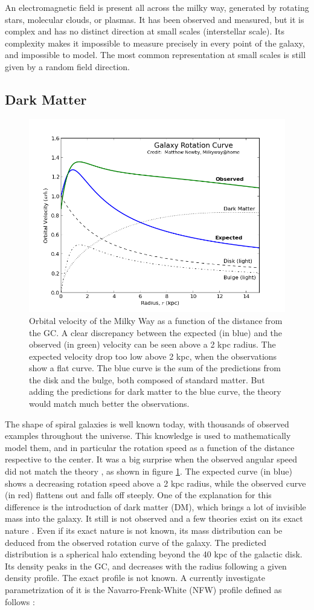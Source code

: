 An electromagnetic field is present all across the milky way, generated by rotating stars, molecular clouds, or plasmas. It has been observed and measured, but it is complex and has no distinct direction at small scales (interstellar scale). Its complexity makes it impossible to measure precisely in every point of the galaxy, and impossible to model. The most common representation at small scales is still given by a random field direction.

\subsection{Dark Matter}

\begin{figure}[h]
 \centering
 \includegraphics[width=.5\linewidth]{pic/theory/gal_rotation_curve.png}
 \caption{Orbital velocity of the Milky Way as a function of the distance from the GC. A clear discrepancy between the expected (in blue) and the observed (in green) velocity can be seen above a 2 kpc radius. The expected velocity drop too low above 2 kpc, when the observations show a flat curve. The blue curve is the sum of the predictions from the disk and the bulge, both composed of standard matter. But adding the predictions for dark matter to the blue curve, the theory would match much better the observations. \cite{Newby2018} \cite{Rubin1971}}
 \label{fig:gal_rotation_curve}
\end{figure}

The shape of spiral galaxies is well known today, with thousands of observed examples throughout the universe. This knowledge is used to mathematically model them, and in particular the rotation speed as a function of the distance respective to the center. It was a big surprise when the observed angular speed did not match the theory \cite{Rubin1971}, as shown in figure \ref{fig:gal_rotation_curve}. The expected curve (in blue) shows a decreasing rotation speed above a 2 kpc radius, while the observed curve (in red) flattens out and falls off steeply.
One of the explanation for this difference is the introduction of dark matter (DM), which brings a lot of invisible mass into the galaxy. It still is not observed and a few theories exist on its exact nature \cite{Hira2017}. Even if its exact nature is not known, its mass distribution can be deduced from the observed rotation curve of the galaxy. The predicted distribution is a spherical halo extending beyond the 40 kpc of the galactic disk. Its density peaks in the GC, and decreases with the radius following a given density profile. The exact profile is not known. A currently investigate parametrization of it is the Navarro-Frenk-White (NFW) profile defined as follows :

